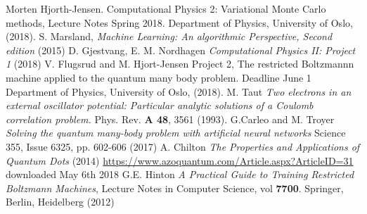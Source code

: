 \documentclass[norsk,a4paper,12pt]{article}
\begin{document}
\begingroup
\renewcommand{\section}[2]{}
\begin{thebibliography}{}
	Morten Hjorth-Jensen.
	Computational Physics 2: Variational Monte Carlo methods, Lecture Notes Spring 2018.
	Department of Physics, University of Oslo,
	(2018).
	S. Marsland, \emph{Machine Learning: An algorithmic Perspective, Second edition} (2015)
	 D. Gjestvang, E. M. Nordhagen \emph{Computational Physics II: Project 1} (2018)
	 V. Flugsrud and M. Hjort-Jensen
	 Project 2, The restricted Boltzmannn machine applied to the quantum many body problem. Deadline June 1
	 Department of Physics, University of Oslo,
	 (2018).
	 M. Taut \emph{Two electrons in an external oscillator potential: Particular analytic solutions of a Coulomb correlation problem.} Phys. Rev. \textbf{A 48}, 3561 (1993).
	 G.Carleo and M. Troyer  \emph{Solving the quantum many-body problem with artificial neural networks} Science 355, Issue 6325, pp. 602-606 (2017)
	 A. Chilton \emph{The Properties and Applications of Quantum Dots} (2014) \url{https://www.azoquantum.com/Article.aspx?ArticleID=31} downloaded May 6th 2018
	 G.E. Hinton \emph{A Practical Guide to Training Restricted Boltzmann Machines}, Lecture Notes in Computer Science, vol \textbf{7700}. Springer, Berlin, Heidelberg (2012)

	
	
\end{thebibliography}
\endgroup
\end{document}
